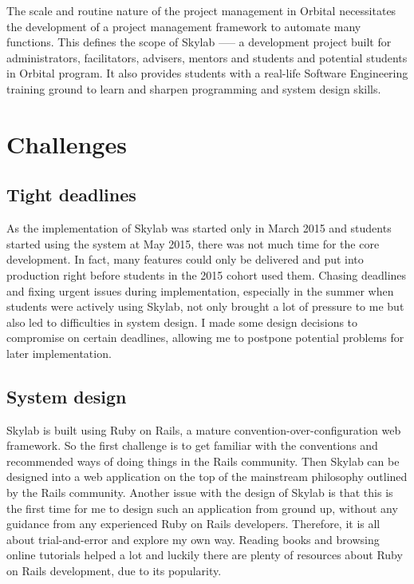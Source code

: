 The scale and routine nature of the project management in Orbital necessitates the development of a project management framework to automate many functions.  This defines the scope of Skylab —-- a development project built for administrators, facilitators, advisers, mentors and students and potential students in Orbital program. It also provides students with a real-life Software Engineering training ground to learn and sharpen programming and system design skills.

\section{Challenges}

\subsection{Tight deadlines}

As the implementation of Skylab was started only in March 2015 and students started using the system at May 2015, there was not much time for the core development. In fact, many features could only be delivered and put into production right before students in the 2015 cohort used them. Chasing deadlines and fixing urgent issues during implementation, especially in the summer when students were actively using Skylab, not only brought a lot of pressure to me but also led to difficulties in system design. I made some design decisions to compromise on certain deadlines, allowing me to postpone potential problems for later implementation.

\subsection{System design}

Skylab is built using Ruby on Rails, a mature convention-over-configuration web framework. So the first challenge is to get familiar with the conventions and recommended ways of doing things in the Rails community. Then Skylab can be designed into a web application on the top of the mainstream philosophy outlined by the Rails community. Another issue with the design of Skylab is that this is the first time for me to design such an application from ground up, without any guidance from any experienced Ruby on Rails developers. Therefore, it is all about trial-and-error and explore my own way. Reading books and browsing online tutorials helped a lot and luckily there are plenty of resources about Ruby on Rails development, due to its popularity.

